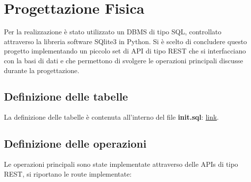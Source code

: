 \section{Progettazione Fisica}

Per la realizzazione è stato utilizzato un DBMS di tipo SQL, controllato attraverso la libreria software SQlite3 in Python. Si è scelto di concludere questo progetto implementando un piccolo set di API di tipo REST che si interfacciano con la basi di dati e che permettono di svolgere le operazioni principali discusse durante la progettazione. 

\subsection{Definizione delle tabelle}
La definizione delle tabelle è contenuta all'interno del file \textbf{init.sql}: \href{https://github.com/krosspile/ecommerce_database/blob/master/src/database/init.sql}{link}.

\subsection{Definizione delle operazioni}

Le operazioni principali sono state implementate attraverso delle APIs di tipo REST, si riportano le route implementate:

